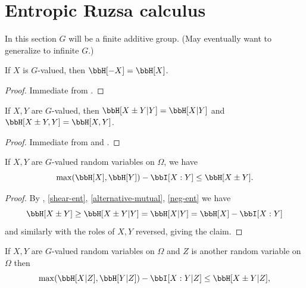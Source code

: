 \chapter{Entropic Ruzsa calculus}

In this section $G$ will be a finite additive group.  (May eventually want to generalize to infinite $G$.)

\begin{lemma}\label{neg-ent}
  \leanok
  If $X$ is $G$-valued, then $\bbH[-X]=\bbH[X]$.
\end{lemma}

\begin{proof}\leanok Immediate from .
\end{proof}

\begin{lemma}\label{shear-ent}
  \leanok
  If $X,Y$ are $G$-valued, then $\bbH[X \pm Y | Y]=\bbH[X|Y]$ and $\bbH[X \pm Y, Y] = \bbH[X, Y]$.
\end{lemma}

\begin{proof}\leanok Immediate from  and .
\end{proof}

\begin{lemma}\label{sumset-lower-gen}
  \leanok
  If $X,Y$ are $G$-valued random variables on $\Omega$, we have
$$ \max(\bbH[X], \bbH[Y]) -  \bbI[X:Y] \leq \bbH[X \pm Y].$$
\end{lemma}

\begin{proof} \leanok
    By , \ref{shear-ent}, \ref{alternative-mutual}, \ref{neg-ent} we have
$$
 \bbH[X\pm Y] \geq \bbH[X\pm Y|Y] = \bbH[X|Y]= \bbH[X] -  \bbI[X:Y]
$$
and similarly with the roles of $X,Y$ reversed, giving the claim.
\end{proof}

\begin{corollary}\label{sumset-lower-gen-cond}
  \leanok
  If $X,Y$ are $G$-valued random variables on $\Omega$ and $Z$ is another random variable on $\Omega$ then
\[
  \max(\bbH[X|Z], \bbH[Y|Z]) -  \bbI[X:Y|Z] \leq \bbH[X\pm Y|Z],
\]
\end{corollary}

